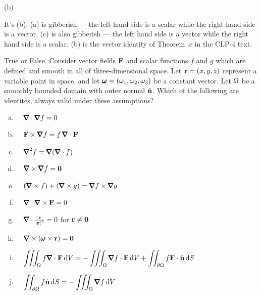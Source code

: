 %

\begin{answer} 
(b)
\end{answer}

\begin{solution}
It's (b). 
(a) is gibberish --- the left hand side is a scalar while the right 
                      hand side is a vector.
(c) is also gibberish --- the left hand side is a vector while the right 
                      hand side is a scalar.
(b) is the vector identity of Theorem .c
in the CLP-4 text.
\end{solution}


\begin{question}[M317 2005A] %
True or False. Consider vector fields $\mathbf{F}$ and scalar functions
$f$ and $g$ which are defined and smooth in all of three-dimensional space.
Let $\mathbf{r}=(x,y,z)$ represent a variable point in space, and let 
$\pmb{\omega} = (\omega_1,\omega_2,\omega_3)$ be a constant vector. Let $\Omega$ be a smoothly 
bounded domain with outer normal $\hat{\mathbf{n}}$. Which of the following are identites, always valid under these assumptions?
\begin{enumerate}[(a)]
\item\ \ 
$\vnabla\cdot\vnabla f = 0$
\item\ \ 
$\vF\times\vnabla f = f\,\vnabla\cdot\vF$
\item\ \ 
$\vnabla^2 f = \vnabla(\vnabla\cdot f)$
\item\ \ 
$\vnabla\times\vnabla f = \vZero$
\item\ \ 
$(\vnabla\times f)+(\vnabla\times g)  = \vnabla f\times\vnabla g$
\item\ \ 
$\vnabla\cdot\vnabla\times\vF = 0$
\item\ \ 
$\vnabla\cdot\frac{\vr}{|\vr|^2} = 0$ for $\mathbf{r}\ne\mathbf{0}$
\item\ \ 
$\vnabla\times(\vom\times\vr) = \vZero$
\item\ \ 
$\displaystyle\tripInt_\Om f\vnabla\cdot\vF\,\dee{V}
 =-\tripInt_\Om \vnabla f\cdot\vF\,\dee{V} 
 +\dblInt_{\partial\Om} f\vF\cdot\hn\,\dee{S}$
\item\ \ 
$\displaystyle\dblInt_{\partial\Om} f\hn\,\dee{S}
  =- \tripInt_\Om \vnabla f\,\dee{V}$
\end{enumerate}


\end{question}

